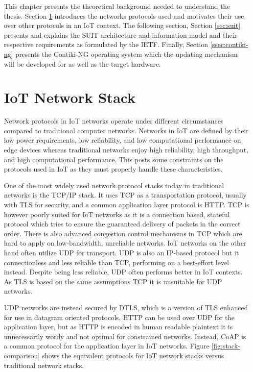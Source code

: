 \documentclass[0-thesis.tex]{subfiles}
\begin{document}
This chapter presents the theoretical background needed to understand the thesis. Section
\ref{sec:network} introduces the networks protocols used and motivates their use over
other protocols in an IoT context. The following section, Section \ref{sec:suit} presents
and explains the SUIT architecture and information model and their respective requirements
as formulated by the IETF. Finally, Section \ref{ssec:contiki-ng} presents the Contiki-NG
operating system which the updating mechanism will be developed for as well as the target
hardware.

\section{IoT Network Stack}
\label{sec:network}
Network protocols in IoT networks operate under different circumstances compared to
traditional computer networks. Networks in IoT are defined by their low power
requirements, low reliability, and low computational performance on edge devices whereas
traditional networks enjoy high reliability, high throughput, and high computational
performance. This posts some constraints on the protocols used in IoT as they must
properly handle these characteristics.

One of the most widely used network protocol stacks today in traditional networks is the
TCP/IP stack. It uses TCP as a transportation protocol, usually with TLS for security, and
a common application layer protocol is HTTP. TCP is however poorly suited for IoT networks
as it is a connection based, stateful protocol which tries to ensure the guaranteed
delivery of packets in the correct order. There is also advanced congestion control
mechanisms in TCP which are hard to apply on low-bandwidth, unreliable networks. IoT
networks on the other hand often utilize UDP for transport. UDP is also an IP-based
protocol but it connectionless and less reliable than TCP, performing on a best-effort
level instead. Despite being less reliable, UDP often performs better in IoT contexts. As
TLS is based on the same assumptions TCP it is unsuitable for UDP networks. 

UDP networks are instead secured by DTLS, which is a version of TLS enhanced for use in
datagram oriented protocols. HTTP can be used over UDP for the application layer, but as
HTTP is encoded in human readable plaintext it is unnecessarily wordy and not optimal for
constrained networks. Instead, CoAP is a common protocol for the application layer in IoT
networks. Figure \ref{fig:stack-comparison} shows the equivalent protocols for IoT network
stacks versus traditional network stacks. 
\end{document}
